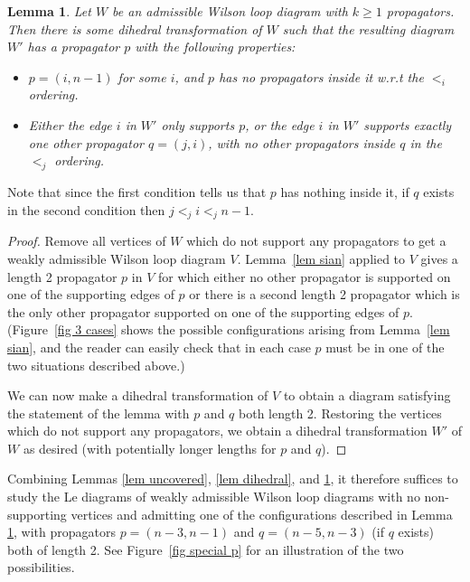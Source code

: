 \documentclass[11pt]{article}
\newtheorem{lem}[thm]{Lemma}
\theoremstyle{remark}
\theoremstyle{definition}
\begin{document}
\vspace{0.5em}


\begin{lem}\label{lem good p}
  Let $W$ be an admissible Wilson loop diagram with $k \geq 1$ propagators.  Then there is some dihedral transformation of $W$ such that the resulting diagram $W'$ has a propagator $p$ with the following properties:
  \begin{itemize}
  \item $p = (i, n-1)$ for some $i$, and $p$ has no propagators inside it w.r.t the $<_i$ ordering.
  \item Either the edge $i$ in $W'$ only supports $p$, or the edge $i$ in $W'$ supports exactly one other propagator $q = (j,i)$, with no other propagators inside $q$ in the $<_j$ ordering. 
  \end{itemize}
\end{lem}
Note that since the first condition tells us that $p$ has nothing inside it, if $q$ exists in the second condition then $j<_ji<_jn-1$. 

\begin{proof}
  Remove all vertices of $W$ which do not support any propagators to get a weakly admissible Wilson loop diagram $V$.  Lemma~\ref{lem sian} applied to $V$ gives a length 2 propagator $p$ in $V$ for which either no other propagator is supported on one of the supporting edges of $p$ or there is a second length 2 propagator which is the only other propagator supported on one of the supporting edges of $p$.  (Figure~\ref{fig 3 cases} shows the possible configurations arising from Lemma~\ref{lem sian}, and the reader can easily check that in each case $p$ must be in one of the two situations described above.)

  We can now make a dihedral transformation of $V$ to obtain a diagram satisfying the statement of the lemma with $p$ and $q$ both length 2. Restoring the vertices which do not support any propagators, we obtain a dihedral transformation $W'$ of $W$ as desired (with potentially longer lengths for $p$ and $q$).
\end{proof}



Combining Lemmas \ref{lem uncovered}, \ref{lem dihedral}, and \ref{lem good p}, it therefore suffices to study the Le diagrams of weakly admissible Wilson loop diagrams with no non-supporting vertices and admitting one of the configurations described in Lemma \ref{lem good p}, with propagators $p = (n-3, n-1)$ and $q= (n-5, n-3)$ (if $q$ exists) both of length 2. See Figure~\ref{fig special p} for an illustration of the two possibilities. 
\end{document}
